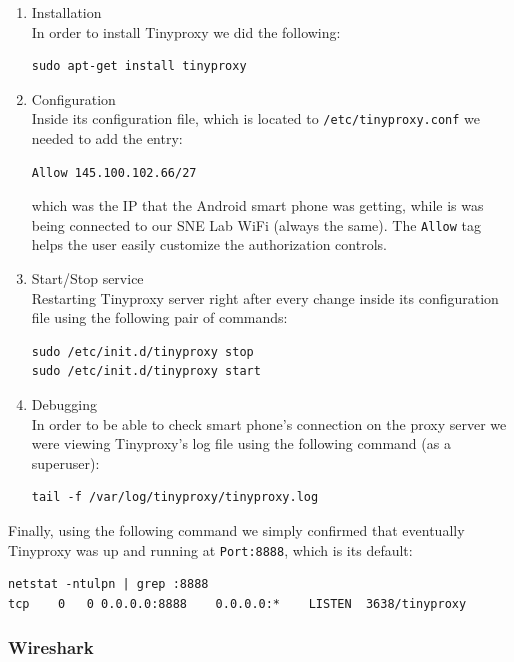 \documentclass[12pt, a4paper]{report}
\begin{document}
\begin{enumerate}
\item Installation \\
In order to install Tinyproxy we did the following:
\begin{lstlisting}[frame=single, breaklines=true]
sudo apt-get install tinyproxy			
\end{lstlisting}	

\item Configuration \\
Inside its configuration file, which is located to \texttt{/etc/tinyproxy.conf} we needed to add the entry:
\begin{lstlisting}[frame=single, breaklines=true]
Allow 145.100.102.66/27			
\end{lstlisting}		
which was the IP that the Android smart phone was getting, while is 			was being connected to our SNE Lab WiFi (always the same). The \texttt{Allow} tag helps the user easily customize the authorization controls. 

\item Start/Stop service \\
Restarting Tinyproxy server right after every change inside its configuration file using the following pair of commands:
\begin{lstlisting}[frame=single, breaklines=true]
sudo /etc/init.d/tinyproxy stop
sudo /etc/init.d/tinyproxy start			
\end{lstlisting}

\item Debugging \\
In order to be able to check smart phone's connection on the proxy server we were viewing Tinyproxy's log file using the following command (as a superuser):
\begin{lstlisting}[frame=single, breaklines=true]
tail -f /var/log/tinyproxy/tinyproxy.log
\end{lstlisting}
\end{enumerate}

Finally, using the following command we simply confirmed that eventually Tinyproxy was up and running at \texttt{Port:8888}, which is its default:

\begin{lstlisting}[frame=single, breaklines=true]
netstat -ntulpn | grep :8888
tcp    0   0 0.0.0.0:8888    0.0.0.0:*    LISTEN  3638/tinyproxy
\end{lstlisting}

\subsubsection{Wireshark}
\end{document}
